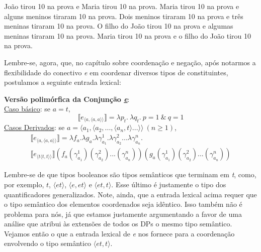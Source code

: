 \begin{exe}
    \ex João tirou 10 na prova e Maria tirou 10 na prova. \label{dde}
    \ex Maria tirou 10 na prova e alguns meninos tiraram 10 na prova.\label{ddf}
    \ex Dois meninos tiraram 10 na prova e três meninas tiraram 10 na prova.\label{ddg}
    \ex O filho do João tirou 10 na prova e algumas meninas tiraram 10 na prova.\label{ddh}
    \ex Maria tirou 10 na prova e o filho do João tirou 10 na prova.\label{ddi}
\end{exe}

\n Lembre-se, agora, que, no capítulo sobre coordenação e negação, após
notarmos a flexibilidade do conectivo \textit{e} em coordenar
diversos tipos de constituintes, postulamos a seguinte entrada
lexical:\\

\begin{tcolorbox}[boxrule=0pt,sharp corners]
	
	\textbf{Versão polimórfica da Conjun\-ção \underline{\textit{e}}}:\\
	
	\underline{Caso básico}: se $a = t$,
	\begin{equation*}
		\llbracket e_{\langle a ,\langle a,a\rangle\rangle}\rrbracket = \lambda p_{t}.\ \lambda q_{t}.\ p=1\ \&\ q=1 
	\end{equation*}
	\underline{Casos Derivados}: se $a = \langle a_{1},\langle a_{2}, ... ,\langle a_{n},t\rangle ... \rangle\rangle\ (n\geq 1)$,
	\begin{multline*}
		\llbracket e_{\langle a ,\langle a,a\rangle\rangle}\rrbracket = \lambda f_{a}.\lambda g_{a}.\lambda \gamma_{a_{1}}^{1}.\lambda \gamma_{a_{2}}^{2}...\lambda \gamma_{a_{n}}^{n}.\\ \llbracket e_{\langle t\langle t,t\rangle\rangle}\rrbracket(f_{a}(\gamma_{a_{1}}^{1})(\gamma_{a_{2}}^{2})...(\gamma_{a_{n}}^{n}))(g_{a}(\gamma_{a_{1}}^{1})(\gamma_{a_{2}}^{2})...(\gamma_{a_{n}}^{n}))
	\end{multline*}
	
\end{tcolorbox}

\bigskip


\n Lembre-se de que tipos booleanos são tipos semânticos que
terminam em \textit{t}, como, por exemplo, $t$, $\langle
et\rangle$, $\langle e,et\rangle$ e $\langle
et,t\rangle$. Esse último é justamente o tipo dos quantificadores
generalizados. Note, ainda, que a entrada lexical acima requer que o
tipo semântico dos elementos coordenados seja idêntico. Isso
também não é problema para nós, já que estamos justamente
argumentando a favor de uma análise que atribui às extensões de
todos os DPs o mesmo tipo semântico. Vejamos então o que a entrada
lexical de \textit{e} nos fornece para a coordenação envolvendo o
tipo semântico $\langle et,t\rangle$.

